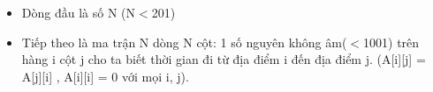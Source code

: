 \begin{itemize}
	\item Dòng đầu là số N (N$<$201)
	\item Tiếp theo là ma trận N dòng N cột: 1 số nguyên không âm($<$1001) trên hàng i cột j cho ta biết thời gian đi từ địa điểm i đến địa điểm j. (A[i][j] = A[j][i] , A[i][i] = 0 với mọi i, j).
\end{itemize}

\